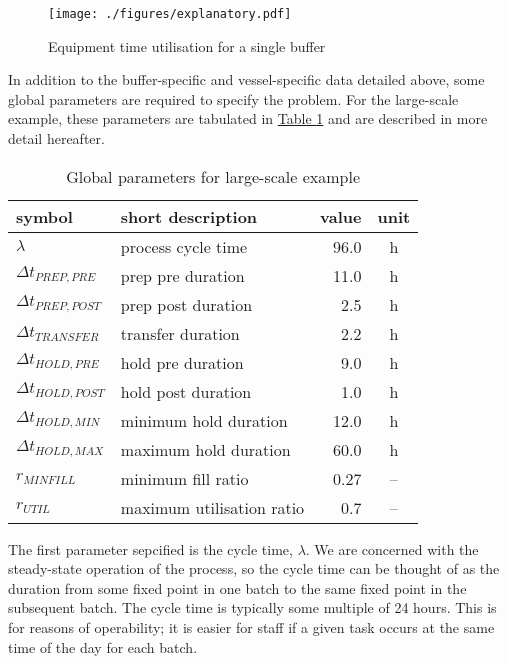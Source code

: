 \begin{figure}
    \centering
    \texttt{[image: ./figures/explanatory.pdf]}
    \caption{Equipment time utilisation for a single buffer}
    \label{fig.explanatory}
\end{figure}

In addition to the buffer-specific and vessel-specific data detailed above,
some global parameters are required to specify the problem.
For the large-scale example, these parameters are tabulated in
\hyperref[tbl.parameters]{Table \ref*{tbl.parameters}} and are described in
more detail hereafter.

\begin{table}[h!]
    \centering
    \caption{Global parameters for large-scale example}
    \label{tbl.parameters}
    \begin{tabular}{l | l | r | c}
        symbol & short description & value & unit\\ \hline
        $\lambda$ & process cycle time & 96.0 & h\\
        $\Delta t_{\mathit{PREP,PRE}}$ & prep pre duration & 11.0 & h\\
        $\Delta t_{\mathit{PREP,POST}}$ & prep post duration & 2.5 & h\\
        $\Delta t_{\mathit{TRANSFER}}$ & transfer duration & 2.2 & h\\
        $\Delta t_{\mathit{HOLD,PRE}}$ & hold pre duration & 9.0 & h\\
        $\Delta t_{\mathit{HOLD,POST}}$ & hold post duration & 1.0 & h\\
        $\Delta t_{\mathit{HOLD,MIN}}$ & minimum hold duration & 12.0 & h\\
        $\Delta t_{\mathit{HOLD,MAX}}$ & maximum hold duration & 60.0 & h\\
        $r_{\mathit{MINFILL}}$ & minimum fill ratio & 0.27 & --\\
        $r_{\mathit{UTIL}}$ & maximum utilisation ratio & 0.7 & --\\
    \end{tabular}
\end{table}

The first parameter sepcified is the cycle time, $\lambda$.  We are concerned
with the steady-state operation of the process, so the cycle time can be
thought of as the duration from some fixed point in one batch to the same
fixed point in the subsequent batch.
The cycle time is typically some multiple of 24 hours.
This is for reasons of operability; it is easier for staff if a given task
occurs at the same time of the day for each batch.

